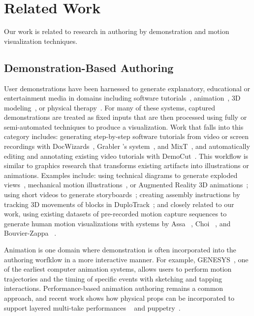
\section{Related Work}
Our work is related to research in authoring by demonstration and motion visualization techniques.

\subsection{Demonstration-Based Authoring}

User demonstrations have been harnessed to generate explanatory, educational or entertainment media in domains including software tutorials~\cite{Bergman:2005:DocWizards,Grabler:2009jj}, animation~\cite{Barnes:2008:VideoPuppetry,held20123d}, 3D modeling~\cite{Zhang:2013:BodyAvatar}, or physical therapy~\cite{Yeager:EECS-2013-91}.
%
For many of these systems, captured demonstrations are treated as fixed inputs that are then processed using fully or semi-automated techniques to produce a visualization.
%
Work that falls into this category includes: generating step-by-step software tutorials from video or screen recordings with DocWizards~\cite{Bergman:2005:DocWizards}, Grabler \ea's system~\cite{Grabler:2009jj}, and MixT~\cite{Chi:2012:MAG:2380116.2380130}, and automatically editing and annotating existing video tutorials with DemoCut~\cite{Chi:2013:DGC:2501988.2502052}.
%
This workflow is similar to graphics research that transforms existing artifacts into illustrations or animations.
Examples include: using technical diagrams to generate exploded views~\cite{li2008automated}, mechanical motion illustrations~\cite{mitra2010illustrating}, or Augmented Reality 3D animations~\cite{Mohr:2015:RTD:2702123.2702490}; using short videos to generate storyboards~\cite{goldman2006schematic}; creating assembly instructions by tracking 3D movements of blocks in DuploTrack~\cite{Gupta2012DuploTrack}; and closely related to our work, using existing datasets of pre-recorded motion capture sequences to generate human motion visualizations with systems by Assa \ea~\cite{assa2005action,assa2008motion}, Choi \ea~\cite{choi2012retrieval}, and Bouvier-Zappa \ea~\cite{bouvier2007motion}.

Animation is one domain where demonstration is often incorporated into the authoring worfklow in a more interactive manner. For example, GENESYS~\cite{Baecker:1969:GENESYS}, one of the earliest computer animation systems, allows users to perform motion trajectories and the timing of specific events with sketching and tapping interactions. Performance-based animation authoring remains a common approach, and recent work shows how physical props can be incorporated to support layered multi-take performances ~\cite{Dontcheva:2003:LAC:1201775.882285,Gupta:2014:MotionMontage} and puppetry~\cite{Barnes:2008:VideoPuppetry,held20123d}.

